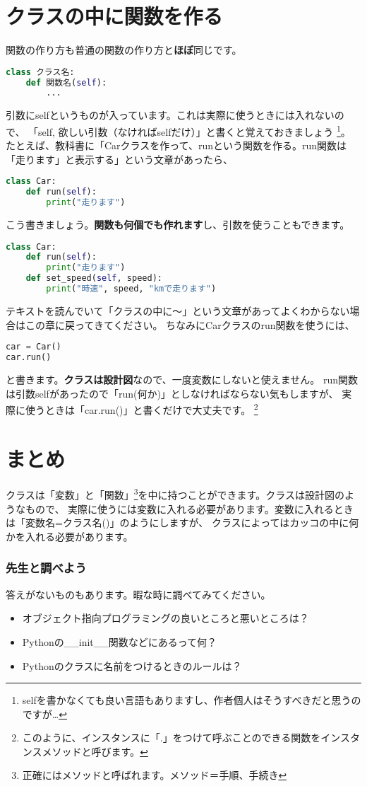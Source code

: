 \newpage
\section{クラスの中に関数を作る}
関数の作り方も普通の関数の作り方と\textbf{ほぼ}同じです。
\begin{lstlisting}[caption=クラスの中に関数を作る,label=sample, language=Python]
class クラス名:
    def 関数名(self):
        ...
\end{lstlisting}
引数にselfというものが入っています。これは実際に使うときには入れないので、
「self, 欲しい引数（なければselfだけ）」と書くと覚えておきましょう
\footnote{selfを書かなくても良い言語もありますし、作者個人はそうすべきだと思うのですが…}。
たとえば、教科書に「Carクラスを作って、runという関数を作る。run関数は「走ります」と表示する」という文章があったら、
\begin{lstlisting}[caption=Carクラスの作り方,label=sample, language=Python]
class Car:
    def run(self):
        print("走ります")
\end{lstlisting}
こう書きましょう。\textbf{関数も何個でも作れます}し、引数を使うこともできます。
\begin{lstlisting}[caption=引数を使う場合,label=sample, language=Python]
class Car:
    def run(self):
        print("走ります")
    def set_speed(self, speed):
        print("時速", speed, "kmで走ります")
\end{lstlisting}
テキストを読んでいて「クラスの中に〜」という文章があってよくわからない場合はこの章に戻ってきてください。
ちなみにCarクラスのrun関数を使うには、
\begin{lstlisting}[caption=Carクラスの使い方,label=sample, language=Python]
car = Car()
car.run()
\end{lstlisting}
と書きます。\textbf{クラスは設計図}なので、一度変数にしないと使えません。
run関数は引数selfがあったので「run(何か)」としなければならない気もしますが、
実際に使うときは「car.run()」と書くだけで大丈夫です。
\footnote{このように、インスタンスに「.」をつけて呼ぶことのできる関数をインスタンスメソッドと呼びます。}

\section{まとめ}
クラスは「変数」と「関数」\footnote{正確にはメソッドと呼ばれます。メソッド＝手順、手続き}を中に持つことができます。クラスは設計図のようなもので、
実際に使うには変数に入れる必要があります。変数に入れるときは「変数名=クラス名()」のようにしますが、
クラスによってはカッコの中に何かを入れる必要があります。

\subsubsection{先生と調べよう}
答えがないものもあります。暇な時に調べてみてください。
\begin{itemize}
  \item オブジェクト指向プログラミングの良いところと悪いところは？
  \item Pythonの\_\_init\_\_関数などにあるって何？
  \item Pythonのクラスに名前をつけるときのルールは？
\end{itemize}